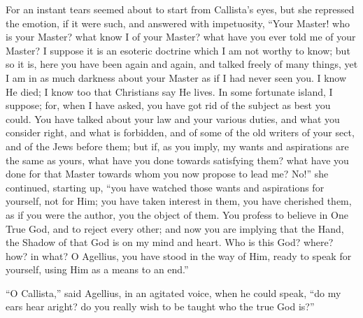 For an instant tears seemed about to start from Callista's eyes,
but she repressed the emotion, if it were such, and answered with
impetuosity, ``Your Master! who is your Master? what know I
of your Master? what have you ever told me of your Master? I suppose
it is an esoteric doctrine which I am not worthy to know; but so it
is, here you have been again and again, and talked freely of many
things, yet I am in as much darkness about your Master as if I had
never seen you. I know He died; I know too that Christians say He
lives. In some fortunate island, I suppose; for, when I have asked,
you have got rid of the subject as best you could. You have talked
about your law and your various duties, and what you consider right,
and what is forbidden, and of some of the old writers of your sect,
and of the Jews before them; but if, as you imply, my wants and
aspirations are the same as yours, what have you done towards
satisfying them? what have you done for that Master towards whom you
now propose to lead me? No!'' she continued, starting up,
``you have watched those wants and aspirations for yourself, not
for Him; you have taken interest in them, you have cherished them, as
if you were the author, you the object of them. You profess to believe
in One True God, and to reject every other; and now you are implying
that the Hand, the Shadow of that God is on my mind and heart. Who is
this God? where? how? in what? O Agellius, you have stood in the way
of Him, ready to speak for yourself, using Him as a means to an
end.''

``O Callista,'' said Agellius, in an agitated voice, when
he could speak, ``do my ears hear aright? do you really wish to be
taught who the true God is?''

